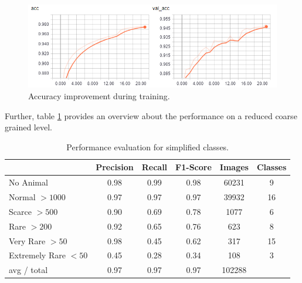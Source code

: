 \documentclass[journal, a4paper]{IEEEtran}
\begin{document}
	\begin{figure}[!hbt]
		\begin{center}
		\includegraphics[width=\columnwidth]{images/acc.png}
		\caption{Accuracy improvement during training.}
		\label{fig:acc}
		\end{center}
	\end{figure}
	
	Further, table \ref{tab:scores} provides an overview about the performance on a reduced coarse grained level.
\begin{table}[ht]
  \centering
  \caption{Performance evaluation for simplified classes.}
  \label{tab:scores}
\begin{tabular}{l|c|c|c|c|c}
	& Precision & Recall  & F1-Score   & Images  & Classes \\ 
	\hline
	\hline
	No Animal         &            0.98    &  0.99  &    0.98  &   60231 & 9 \\
	Normal $>1000$   &          0.97    &  0.97  &    0.97   &  39932 & 16 \\
	Scarce $>500$          &       0.90    &  0.69  &    0.78    &  1077 & 6 \\
	Rare $>200$              &       0.92    &  0.65 &     0.76     &  623 & 8 \\
	Very Rare $>50$      &        0.98   &   0.45 &     0.62    &   317 & 15\\
	Extremely Rare $<50$ &    0.45 &     0.28 &     0.34  &     108 & 3\\
	\hline
	\hline 
	 avg / total     &  0.97   &   0.97  &    0.97  &  102288 \\
\end{tabular}
\end{table}
\end{document}
